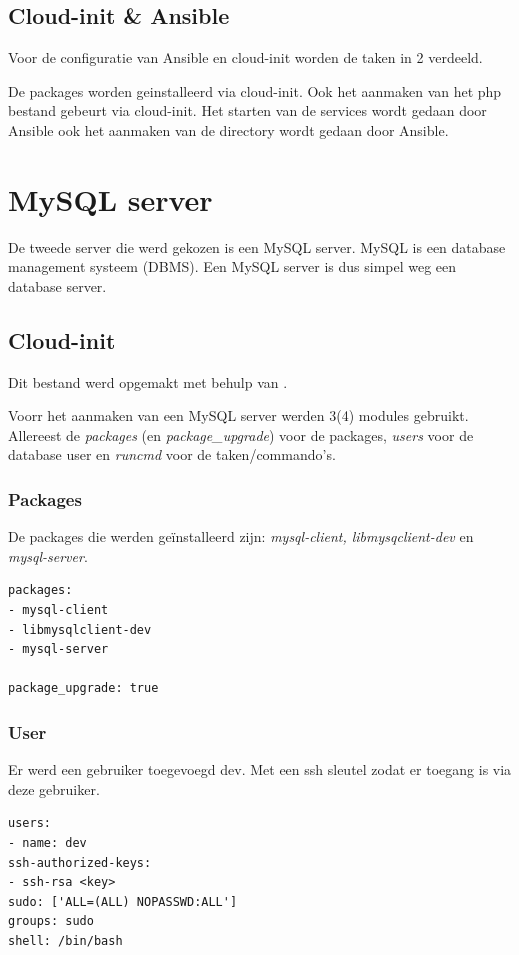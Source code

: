 \subsection{Cloud-init \& Ansible}
\label{ch:cloudansiserverconf}
Voor de configuratie van Ansible en cloud-init worden de taken in 2 verdeeld. 

De packages worden geinstalleerd via cloud-init. Ook het aanmaken van het php bestand gebeurt via cloud-init. Het starten van de services wordt gedaan door Ansible ook het aanmaken van de directory wordt gedaan door Ansible.

\section{MySQL server}
De tweede server die werd gekozen is een MySQL server. MySQL is een database management systeem (DBMS). Een MySQL server is dus simpel weg een database server.

\subsection{Cloud-init}
Dit bestand werd opgemakt met behulp van \autocite{dias}.

Voorr het aanmaken van een MySQL server werden 3(4) modules gebruikt. Allereest de \textit{packages} (en \textit{package\_upgrade}) voor de packages, \textit{users} voor de database user en \textit{runcmd} voor de taken/commando's.

\subsubsection{Packages}
De packages die werden geïnstalleerd zijn: \textit{mysql-client, libmysqclient-dev} en \textit{mysql-server}.
\begin{lstlisting}[basicstyle=\small]
packages:
- mysql-client
- libmysqlclient-dev
- mysql-server

package_upgrade: true
\end{lstlisting}

\subsubsection{User}
Er werd een gebruiker toegevoegd dev. Met een ssh sleutel zodat er toegang is via deze gebruiker.
\begin{lstlisting}[basicstyle=\small]
users:
- name: dev
ssh-authorized-keys:
- ssh-rsa <key>
sudo: ['ALL=(ALL) NOPASSWD:ALL']
groups: sudo
shell: /bin/bash
\end{lstlisting}

